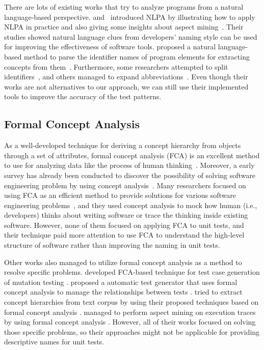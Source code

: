 There are lots of existing works that try to analyze programs from a natural language-based perspective.
%
\citeauthor{pollock2007introducing} and~\citeauthor{shepherd2007using} introduced NLPA by illustrating how to apply NLPA in practice and also giving some insights about aspect mining~\cite{pollock2007introducing,shepherd2007using,pollock2009natural}.
%
Their studies showed natural language clues from developers' naming style can be used for improving the effectiveness of software tools.
%
\citeauthor{abebe2010natural} proposed a natural language-based method to parse the identifier names of program elements for extracting concepts from them~\cite{abebe2010natural}.
%
Furthermore, some researchers attempted to split identifiers~\cite{enslen2009mining,butler2011improving,guerrouj2013tidier,hill2014empirical}, and others managed to expand abbreviations~\cite{hill2008amap,madani2010recognizing,corazza2012linsen}.
%
Even though their works are not alternatives to our approach, we can still use their implemented tools to improve the accuracy of the test patterns.


\subsection{Formal Concept Analysis}

As a well-developed technique for deriving a concept hierarchy from objects through a set of attributes, formal concept analysis (FCA) is an excellent method to use for analyzing data like the process of human thinking~\cite{ganter2012formal,yao2004comparative}.
%
Moreover, a early survey has already been conducted to discover the possibility of solving software engineering problem by using concept analysis~\cite{tilley2005survey}.
%
Many researchers focused on using FCA as an efficient method to provide solutions for various software engineering problems~\cite{godin2005formal,park2000software,cellier2008formal,hesse2005formal,mens2005delving}, and they used concept analysis to mock how human (i.e., developers) thinks about writing software or trace the thinking inside existing software.
%
However, none of them focused on applying FCA to unit tests, and their technique paid more attention to use FCA to understand the high-level structure of software rather than improving the naming in unit tests.

Other works also managed to utilize formal concept analysis as a method to resolve specific problems.
%
\citeauthor{he2011test} developed FCA-based technique for test case generation of mutation testing \cite{he2011test}.
%
\citeauthor{khor2004using} proposed a automatic test generator that uses formal concept analysis to manage the relationships between tests \cite{khor2004using}.
%
\citeauthor{cimiano2005learning} tried to extract concept hierarchies from text corpus by using their proposed techniques based on formal concept analysis \cite{cimiano2005learning}.
%
\citeauthor{tonella2004aspect} managed to perform aspect mining on execution traces by using formal concept analysis \cite{tonella2004aspect}.
%
However, all of their works focused on solving those specific problems, so their approaches might not be applicable for providing descriptive names for unit tests.


